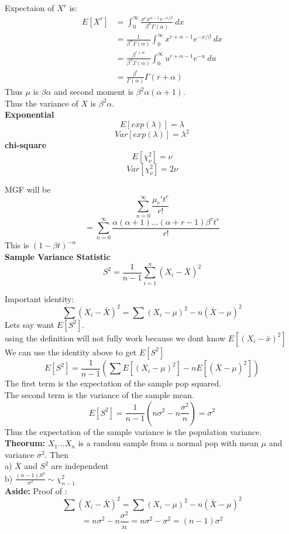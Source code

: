 \documentclass{article}
\begin{document}
Expectaion of $X^r$ is:
\begin{align*}
    E[X^r] &= \int_{0}^{\infty} \frac{x^r x^{\alpha-1} e^{-x/\beta}}{\beta^\alpha \Gamma(\alpha)}\ dx\\
    &= \frac{1}{\beta^\alpha \Gamma(\alpha)} \int_{0}^{\infty} x^{r+\alpha-1} e^{-x/\beta}\ dx\\
    &= \frac{\beta^{r+\alpha}}{\beta^\alpha \Gamma(\alpha)} \int_{0}^{\infty} u^{r+\alpha-1} e^{-u}\ du\\
    &= \frac{\beta^r}{\Gamma(\alpha)} \Gamma(r+\alpha)
\end{align*}
Thus $\mu$ is $\beta\alpha$ and second moment is $\beta^2\alpha(\alpha + 1)$.\\
Thus the variance of $X$ is $\beta^2\alpha$.\\
\textbf{Exponential}
$$E[exp(\lambda)] = \lambda $$
$$ Var[exp(\lambda)] = \lambda^2$$
\textbf{chi-square}
$$E[\chi^2_{\nu}] = \nu$$
$$Var[\chi^2_{\nu}] = 2\nu$$

MGF will be 
$$\sum_{n=0}^{\infty} \frac{\mu_r' t^r}{r!}$$
$$= \sum_{n=0}^{\infty} \frac{\alpha(\alpha+1)\ldots(\alpha+r-1)\beta^r t^r}{r!}$$
This is $(1-\beta t)^{-\alpha}$\\

\textbf{Sample Variance Statistic}
$$S^2 = \frac{1}{n-1} \sum_{i=1}^{n} (X_i - \bar{X})^2$$

Important identity:
$$ \sum (X_i - \bar{X})^2 = \sum (X_i - \mu)^2 - n(\bar{X} - \mu)^2$$
Lets say want $E[S^2]$.\\
using the definition will not fully work because we dont know $E[(X_i - \bar{x})^2]$\\
We can use the identity above to get $E[S^2]$\\
$$E[S^2] = \frac{1}{n-1} (\sum E[(X_i - \mu)^2] - nE[(\bar{X} - \mu)^2])$$
The first term is the expectation of the sample pop squared.\\
The second term is the variance of the sample mean.\\
$$E[S^2] = \frac{1}{n-1} (n\sigma^2 - n\frac{\sigma^2}{n}) = \sigma^2$$
Thus the expectation of the sample variance is the population variance.\\
\textbf{Theorum:}
$X_1 ... X_n$ is a random sample from a normal pop with mean $\mu$ and variance $\sigma^2$. Then \\
a) $\bar{X}$ and $S^2$ are independent\\
b) $\frac{(n-1)S^2}{\sigma^2} \sim \chi^2_{n-1}$\\
\textbf{Aside:}
Proof of :
$$ \sum (X_i - \bar{X})^2 = \sum (X_i - \mu)^2 - n(\bar{X} - \mu)^2$$
$$ = n \sigma^2 - n \frac{\sigma^2}{n} = n \sigma^2 - \sigma^2 = (n-1) \sigma^2$$
\end{document}
